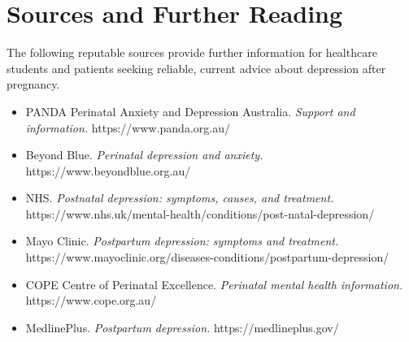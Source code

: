 \section*{Sources and Further Reading}
The following reputable sources provide further information for healthcare students and patients seeking reliable, current advice about depression after pregnancy.

\begin{itemize}
    \item PANDA Perinatal Anxiety and Depression Australia. \textit{Support and information.} https://www.panda.org.au/
    \item Beyond Blue. \textit{Perinatal depression and anxiety.} https://www.beyondblue.org.au/
    \item NHS. \textit{Postnatal depression: symptoms, causes, and treatment.} https://www.nhs.uk/mental-health/conditions/post-natal-depression/
    \item Mayo Clinic. \textit{Postpartum depression: symptoms and treatment.} https://www.mayoclinic.org/diseases-conditions/postpartum-depression/
    \item COPE Centre of Perinatal Excellence. \textit{Perinatal mental health information.} https://www.cope.org.au/
    \item MedlinePlus. \textit{Postpartum depression.} https://medlineplus.gov/
\end{itemize}
